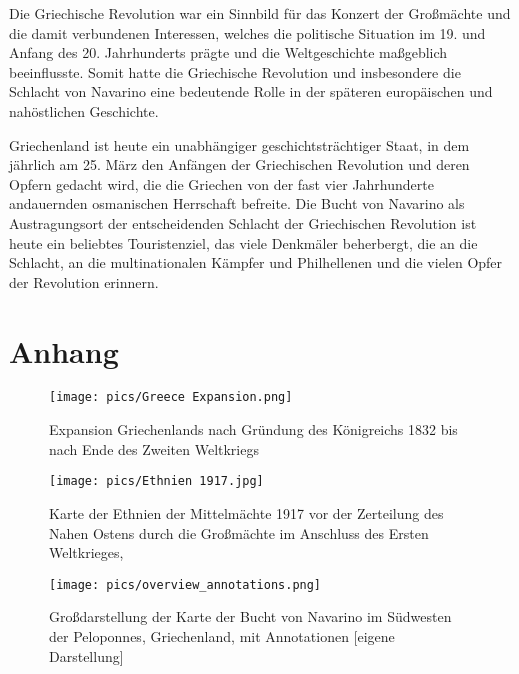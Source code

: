 \documentclass[preprint]{geomorphica} %
\begin{document}
Die Griechische Revolution war ein Sinnbild für das Konzert der Großmächte und die damit verbundenen Interessen, welches die politische Situation im 19. und Anfang des 20. Jahrhunderts prägte und die Weltgeschichte maßgeblich beeinflusste.
Somit hatte die Griechische Revolution und insbesondere die Schlacht von Navarino eine bedeutende Rolle in der späteren europäischen und nahöstlichen Geschichte.

Griechenland ist heute ein unabhängiger geschichtsträchtiger Staat, in dem jährlich am 25. März den Anfängen der Griechischen Revolution und deren Opfern gedacht wird, die die Griechen von der fast vier Jahrhunderte andauernden osmanischen Herrschaft befreite. 
Die Bucht von Navarino als Austragungsort der entscheidenden Schlacht der Griechischen Revolution ist heute ein beliebtes Touristenziel, das viele Denkmäler beherbergt, die an die Schlacht, an die multinationalen Kämpfer und Philhellenen und die vielen Opfer der Revolution erinnern.


\newpage
\renewcommand\refname{Literaturverzeichnis}




\newpage
\appendix
\section*{Anhang}

\begin{figure}[h!]
    \centering
    \texttt{[image: pics/Greece Expansion.png]}
    \caption{Expansion Griechenlands nach Gründung des Königreichs 1832 bis nach Ende des Zweiten Weltkriegs \cite{HistoricairRursus2007}}
    \label{pic:greeceexpansion}
\end{figure}

\begin{figure}
    \centering
    \texttt{[image: pics/Ethnien 1917.jpg]}
    \caption{Karte der Ethnien der Mittelmächte 1917 vor der Zerteilung des Nahen Ostens durch die Großmächte im Anschluss des Ersten Weltkrieges, \cite{Cassell1917}}
    \label{pic:ethnien1917}
\end{figure}

\begin{figure}
    \centering
    \texttt{[image: pics/overview\_annotations.png]}
    \caption{Großdarstellung der Karte der Bucht von Navarino im Südwesten der Peloponnes, Griechenland, mit Annotationen [eigene Darstellung]}
    \label{pic:overviewlarge}
\end{figure}
\end{document}
